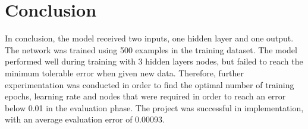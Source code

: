 \section*{Conclusion}
In conclusion, the model received two inputs, one hidden layer and one output. The network was trained using 500 examples in the training dataset. The model performed well during training with 3 hidden layers nodes, but failed to reach the minimum tolerable error when given new data. Therefore, further experimentation was conducted in order to find the optimal number of training epochs, learning rate and nodes that were required in order to reach an error below 0.01 in the evaluation phase. The project was successful in implementation, with an average evaluation error of 0.00093.
